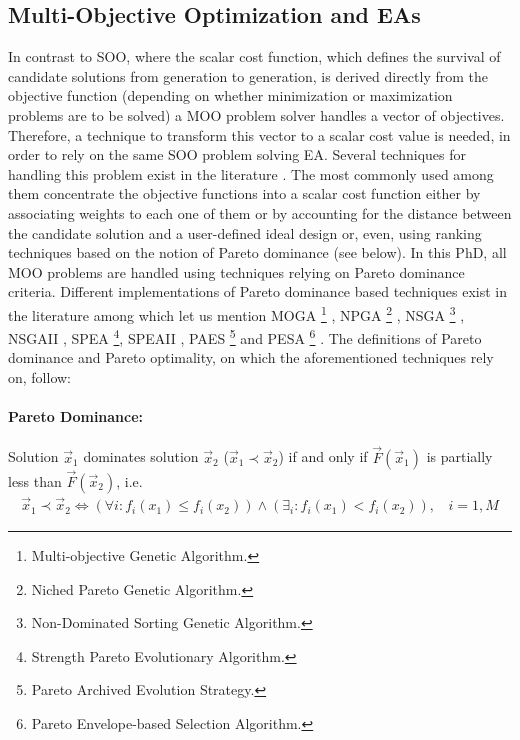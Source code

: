 \subsection{Multi-Objective Optimization and EAs}
\label{MOOini}
In contrast to SOO, where the scalar cost function, which defines the survival of candidate solutions from generation to generation, is derived directly from the objective function (depending on whether minimization or maximization problems are to be solved) a MOO problem solver handles a vector of objectives. Therefore, a technique to transform this vector to a scalar cost value is needed, in order to rely on the same SOO problem solving EA. Several techniques for handling this problem exist in the literature \cite{CoCo99,coe02,Miett99}. The most commonly used among them concentrate the objective functions into a scalar cost function either by associating weights to each one of them or by accounting for the distance between the candidate solution and a user-defined ideal design or, even, using ranking techniques based on the notion of Pareto dominance (see below). In this PhD, all MOO problems are handled using techniques relying on Pareto dominance criteria. Different implementations of Pareto dominance based techniques exist in the literature among which let us mention MOGA \footnote{Multi-objective Genetic Algorithm.} \cite{Fon93}, NPGA \footnote{Niched Pareto Genetic Algorithm.} \cite{horn94}, NSGA \footnote{Non-Dominated Sorting Genetic Algorithm.} \cite{Sri1995}, NSGAII \cite{Deb00a}, SPEA \footnote{Strength Pareto Evolutionary Algorithm.}\cite{ZiTh98}, SPEAII \cite{Zitz02,Zitz01}, PAES \footnote{Pareto Archived Evolution Strategy.} \cite{knowles99} and PESA \footnote{Pareto Envelope-based Selection Algorithm.} \cite{corne00}. The definitions of Pareto dominance and Pareto optimality, on which the aforementioned techniques rely on, follow:

\paragraph{Pareto Dominance:} Solution $\vec{x}_1$ dominates solution $\vec{x}_2$ ($\vec{x}_1\prec\vec{x}_2$) if and only if $\vec{F}(\vec{x}_1)$ is partially less than $\vec{F}(\vec{x}_2)$, i.e.
\begin{eqnarray}
    \vec{x}_1\prec\vec{x}_2 \Leftrightarrow (\forall i :  f_i(x_1) \leq f_i(x_2))\wedge (\exists _i : f_i(x_1) < f_i(x_2)),~~~~i=1,M
   \label{pareto_eq} 
\end{eqnarray}

